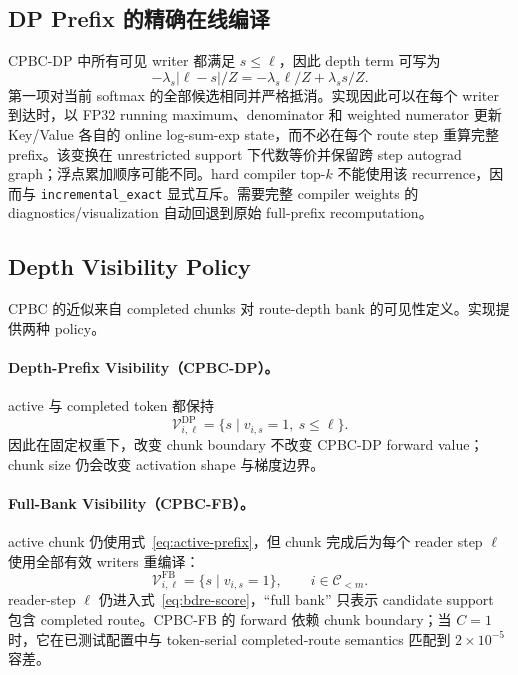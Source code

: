 \documentclass[UTF8,twocolumn,10pt,a4paper]{ctexart}
\newcommand{\CPBC}{\textsf{CPBC}}
\newcommand{\DP}{\textsf{CPBC-DP}}
\newcommand{\FB}{\textsf{CPBC-FB}}
\newcommand{\code}[1]{\texttt{#1}}
\begin{document}
\subsection{DP Prefix 的精确在线编译}
\DP{} 中所有可见 writer 都满足 $s\le\ell$，因此 depth term 可写为
\begin{equation}
  -\lambda_s |\ell-s|/Z
  =-\lambda_s\ell/Z+\lambda_s s/Z.
  \label{eq:online-prefix}
\end{equation}
第一项对当前 softmax 的全部候选相同并严格抵消。实现因此可以在每个 writer 到达时，以 FP32 running maximum、denominator 和 weighted numerator 更新 Key/Value 各自的 online log-sum-exp state，而不必在每个 route step 重算完整 prefix。该变换在 unrestricted support 下代数等价并保留跨 step autograd graph；浮点累加顺序可能不同。hard compiler top-$k$ 不能使用该 recurrence，因而与 \code{incremental\_exact} 显式互斥。需要完整 compiler weights 的 diagnostics/visualization 自动回退到原始 full-prefix recomputation。

\subsection{Depth Visibility Policy}
\CPBC{} 的近似来自 completed chunks 对 route-depth bank 的可见性定义。实现提供两种 policy。

\paragraph{Depth-Prefix Visibility（\DP{}）。}
active 与 completed token 都保持
\begin{equation}
  \mathcal V^{\mathrm{DP}}_{i,\ell}
  =\{s\mid v_{i,s}=1,\ s\le\ell\}.
  \label{eq:dp}
\end{equation}
因此在固定权重下，改变 chunk boundary 不改变 \DP{} forward value；chunk size 仍会改变 activation shape 与梯度边界。

\paragraph{Full-Bank Visibility（\FB{}）。}
active chunk 仍使用式~\eqref{eq:active-prefix}，但 chunk 完成后为每个 reader step $\ell$ 使用全部有效 writers 重编译：
\begin{equation}
  \mathcal V^{\mathrm{FB}}_{i,\ell}
  =\{s\mid v_{i,s}=1\},\qquad i\in\mathcal C_{<m}.
  \label{eq:fb}
\end{equation}
reader-step $\ell$ 仍进入式~\eqref{eq:bdre-score}，``full bank'' 只表示 candidate support 包含 completed route。\FB{} 的 forward 依赖 chunk boundary；当 $C=1$ 时，它在已测试配置中与 token-serial completed-route semantics 匹配到 $2\times10^{-5}$ 容差。
\end{document}
